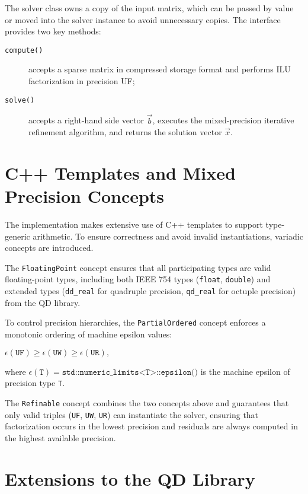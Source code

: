 The solver class owns a copy of the input matrix, which can be passed by value
or moved into the solver instance to avoid unnecessary copies. The interface
provides two key methods:
\begin{description}
\item[\texttt{compute()}] accepts a sparse matrix in compressed storage format and performs
  ILU factorization in precision UF;
\item[\texttt{solve()}] accepts a right-hand side vector \(\vec{b}\), executes the mixed-precision
  iterative refinement algorithm, and returns the solution vector \(\vec{x}\).
\end{description}

\section{C++ Templates and Mixed Precision Concepts}
\label{sec:c++-templates-mixed}

The implementation makes extensive use of C++ templates to support type-generic
arithmetic. To ensure correctness and avoid invalid instantiations, variadic
concepts are introduced.

The \texttt{FloatingPoint} concept ensures that all participating types are valid
floating-point types, including both IEEE 754 types (\texttt{float},
\texttt{double}) and extended types (\texttt{dd\_real} for quadruple precision,
\texttt{qd\_real} for octuple precision) from the QD
\cite{david_bailey_bl-highprecisionqd_2025} library.

To control precision hierarchies, the \texttt{PartialOrdered} concept enforces a
monotonic ordering of machine epsilon values:
\begin{center}
  \(\epsilon(\texttt{UF}) \ge \epsilon(\texttt{UW}) \ge \epsilon(\texttt{UR}),\)
\end{center}
where \(\epsilon(\texttt{T}) = \texttt{std::numeric\_limits<T>::epsilon()}\) is the machine
epsilon of precision type \texttt{T}.

The \texttt{Refinable} concept combines the two concepts above and guarantees that
only valid triples (\texttt{UF}, \texttt{UW}, \texttt{UR}) can instantiate the solver, ensuring
that factorization occurs in the lowest precision and residuals are always
computed in the highest available precision.

\section{Extensions to the QD Library}
\label{sec:extens-qd-libr}

